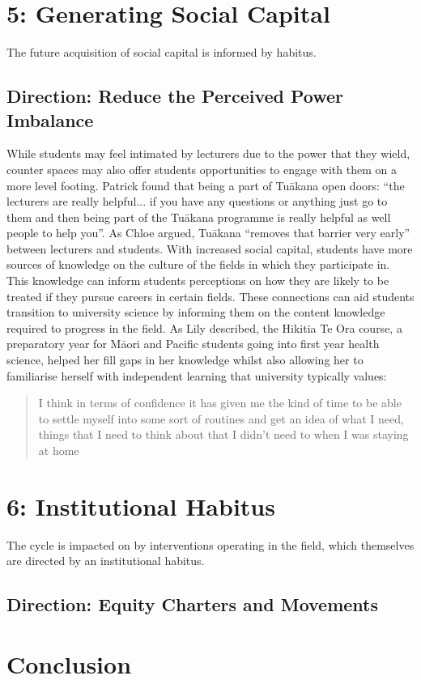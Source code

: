 \section{5: Generating Social Capital}
The future acquisition of social capital is informed by habitus.

\subsection{Direction: Reduce the Perceived Power Imbalance}
While students may feel intimated by lecturers due to the power that they wield, counter spaces may also offer students opportunities to engage with them on a more level footing. Patrick found that being a part of Tu\={a}kana open doors: ``the lecturers are really helpful... if you have any questions or anything just go to them and then being part of the Tu\={a}kana programme is really helpful as well people to help you''. As Chloe argued, Tu\={a}kana ``removes that barrier very early'' between lecturers and students. With increased social capital, students have more sources of knowledge on the culture of the fields in which they participate in. This knowledge can inform students perceptions on how they are likely to be treated if they pursue careers in certain fields. These connections can aid students transition to university science by informing them on the content knowledge required to progress in the field. As Lily described, the Hikitia Te Ora course, a preparatory year for M\={a}ori and Pacific students going into first year health science, helped her fill gaps in her knowledge whilst also allowing her to familiarise herself with independent learning that university typically values: \blockquote{I think in terms of confidence it has given me the kind of time to be able to settle myself into some sort of routines and get an idea of what I need, things that I need to think about that I didn't need to when I was staying at home}. 


\section{6: Institutional Habitus}
The cycle is impacted on by interventions operating in the field, which themselves are directed by an institutional habitus.


\subsection{Direction: Equity Charters and Movements}


\section{Conclusion}


